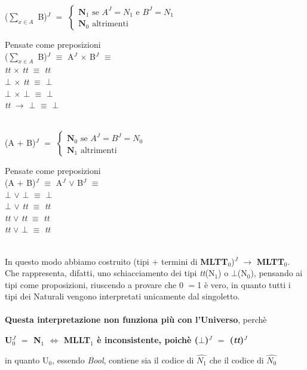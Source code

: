 \begin{enumerate}
\begin{center}
($\sum\limits_{x \in A}$ B)$^J$ $=$
$
\begin{cases}
\textbf{N}_1\text{ se } A^J =  N_1  \text{ e } B^J = N_1\\
\textbf{N}_0 \text{ altrimenti}
\end{cases}
$
\end{center}
\noindent
Pensate come preposizioni \\
($\sum\limits_{x \in A}$ B)$^J$ $\equiv$ A$^J$ $\times$ B$^J$ $\equiv$\\
\textit{tt} $\times$ \textit{tt} $\equiv$ \textit{tt}\\
$\bot$ $\times$ \textit{tt} $\equiv$ $\bot$  \\
$\bot$ $\times$ $\bot$ $\equiv$ $\bot$ \\
\textit{tt} $\rightarrow$ $\bot$ $\equiv$ $\bot$\\\\

\begin{center}
(A $+$ B)$^J$ $=$
$
\begin{cases}
\textbf{N}_0\text{ se } A^J = B^J = N_0\\
\textbf{N}_1 \text{ altrimenti}
\end{cases}
$
\end{center}
\noindent
Pensate come preposizioni \\
(A $+$ B)$^J$ $\equiv$ A$^J$ $\vee$ B$^J$ $\equiv$\\
$\bot$  $\vee$ $\bot$  $\equiv$ $\bot$ \\
$\bot$ $\vee$ \textit{tt} $\equiv$ \textit{tt}  \\
\textit{tt} $\vee$ \textit{tt} $\equiv$ \textit{tt} \\
\textit{tt} $\vee$ $\bot$ $\equiv$ \textit{tt}\\\\

\end{enumerate}
\noindent
In questo modo abbiamo costruito (tipi $+$ termini di \textbf{MLTT$_0$})$^J$ $\rightarrow$ \textbf{MLTT$_0$}. Che rappresenta, difatti, uno schiacciamento dei tipi \textit{tt}(N$_1$) o $\bot$(N$_0$), pensando ai tipi come proposizioni, riuscendo a provare che 0 $=$1 \`e vero, in quanto tutti i tipi dei Naturali vengono interpretati unicamente dal singoletto.\\\\
\noindent
\textbf{Questa interpretazione non funziona pi\`u con l'Universo}, perch\`e
\begin{center}\textbf{U$_0^J$  $=$ N$_1$ $\Leftrightarrow$ MLLT$_1$ \`e inconsistente, poich\`e ($\bot$)$^J$ $=$ (\textit{tt})$^J$} \end{center}
in quanto U$_0$, essendo \textit{Bool}, contiene sia il codice di $\hat{N_1}$ che il codice di $\hat{N_0}$



